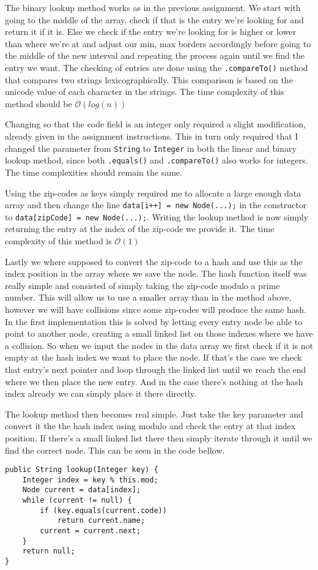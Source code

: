 \documentclass[a4paper,11pt]{article}
\begin{document}
The binary lookup method works as in the previous assignment. We start with going to the middle of the array, check if that is the entry we're looking for and return it if it
is. Else we check if the entry we're looking for is higher or lower than where we're at and adjust our min, max borders accordingly before going to the middle of the new interval
and repeating the process again until we find the entry we want. The checking of entries are done using the {\tt .compareTo()} method that compares two strings lexicographically.
This comparison is based on the unicode value of each character in the strings. The time complexity of this method should be $\mathcal{O}(log(n))$

Changing so that the code field is an integer only required a slight modification, already given in the assignment instructions. This in turn only required that I changed the
parameter from {\tt String} to {\tt Integer} in both the linear and binary lookup method, since both {\tt .equals()} and {\tt .compareTo()} also works for integers. The time
complexities should remain the same.

Using the zip-codes as keys simply required me to allocate a large enough data array and then change the line {\tt data[i++] = new Node(...);} in the constructor to
    {\tt data[zipCode] = new Node(...);}. Writing the lookup method is now simply returning the entry at the index of the zip-code we provide it. The time complexity of this
method is $\mathcal{O}(1)$

Lastly we where supposed to convert the zip-code to a hash and use this as the index position in the array where we save the node. The hash function itself was really simple and
consisted of simply taking the zip-code modulo a prime number. This will allow us to use a smaller array than in the method above, however we will have collisions since some
zip-codes will produce the same hash. In the first implementation this is solved by letting every entry node be able to point to another node, creating a small linked list on
those indexes where we have a collision. So when we input the nodes in the data array we first check if it is not empty at the hash index we want to place the node. If that's
the case we check that entry's next pointer and loop through the linked list until we reach the end where we then place the new entry. And in the case there's nothing at the
hash index already we can simply place it there directly.

The lookup method then becomes real simple. Just take the key parameter and convert it the the hash index using modulo and check the entry at that index position. If there's a
small linked list there then simply iterate through it until we find the correct node. This can be seen in the code bellow.
\begin{verbatim}
public String lookup(Integer key) {
    Integer index = key % this.mod;
    Node current = data[index];
    while (current != null) {
        if (key.equals(current.code))
            return current.name;
        current = current.next;
    }
    return null;
}
\end{verbatim}
\end{document}
